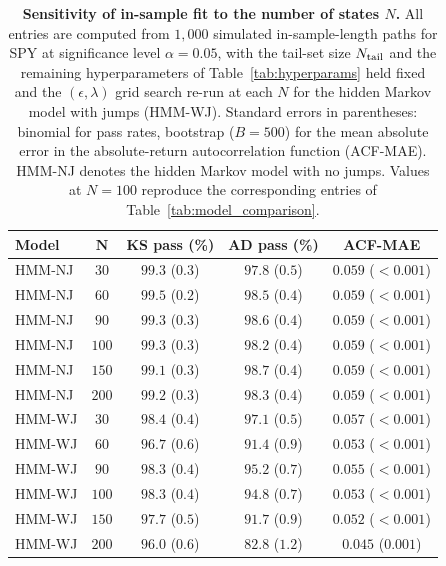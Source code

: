\begin{table}[H]
\centering
\caption{\textbf{Sensitivity of in-sample fit to the number of
    states $N$.} All entries are computed from $1{,}000$ simulated
    in-sample-length paths for SPY at significance level
    $\alpha = 0.05$, with the tail-set size $N_{\rm tail}$ and the
    remaining hyperparameters of Table~\ref{tab:hyperparams} held
    fixed and the $(\epsilon, \lambda)$ grid search re-run at each
    $N$ for the hidden Markov model with jumps (HMM-WJ). Standard
    errors in parentheses: binomial for pass rates, bootstrap
    ($B = 500$) for the mean absolute error in the absolute-return
    autocorrelation function (ACF-MAE). HMM-NJ denotes the hidden
    Markov model with no jumps. Values at $N = 100$ reproduce the
    corresponding entries of Table~\ref{tab:model_comparison}.}
\label{tab:sensitivity_n}
\small
\begin{tabular}{@{}lcccc@{}}
\toprule
\textbf{Model} & $\boldsymbol{N}$ & \textbf{KS pass (\%)} &
  \textbf{AD pass (\%)} & \textbf{ACF-MAE} \\ \midrule
HMM-NJ & $30$  & $99.3$ ($0.3$) & $97.8$ ($0.5$) & $0.059$ ($<\!0.001$) \\
HMM-NJ & $60$  & $99.5$ ($0.2$) & $98.5$ ($0.4$) & $0.059$ ($<\!0.001$) \\
HMM-NJ & $90$  & $99.3$ ($0.3$) & $98.6$ ($0.4$) & $0.059$ ($<\!0.001$) \\
HMM-NJ & $100$ & $99.3$ ($0.3$) & $98.2$ ($0.4$) & $0.059$ ($<\!0.001$) \\
HMM-NJ & $150$ & $99.1$ ($0.3$) & $98.7$ ($0.4$) & $0.059$ ($<\!0.001$) \\
HMM-NJ & $200$ & $99.2$ ($0.3$) & $98.3$ ($0.4$) & $0.059$ ($<\!0.001$) \\ \midrule
HMM-WJ & $30$  & $98.4$ ($0.4$) & $97.1$ ($0.5$) & $0.057$ ($<\!0.001$) \\
HMM-WJ & $60$  & $96.7$ ($0.6$) & $91.4$ ($0.9$) & $0.053$ ($<\!0.001$) \\
HMM-WJ & $90$  & $98.3$ ($0.4$) & $95.2$ ($0.7$) & $0.055$ ($<\!0.001$) \\
HMM-WJ & $100$ & $98.3$ ($0.4$) & $94.8$ ($0.7$) & $0.053$ ($<\!0.001$) \\
HMM-WJ & $150$ & $97.7$ ($0.5$) & $91.7$ ($0.9$) & $0.052$ ($<\!0.001$) \\
HMM-WJ & $200$ & $96.0$ ($0.6$) & $82.8$ ($1.2$) & $0.045$ ($0.001$) \\
\bottomrule
\end{tabular}
\end{table}


